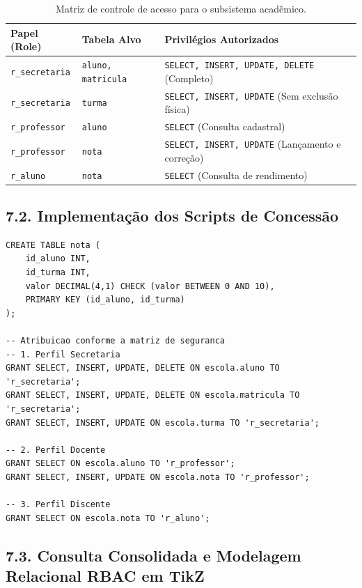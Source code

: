 \begin{table}[h!]
\centering
\small
\begin{tabular}{|l|l|l|}
\hline
\textbf{Papel (Role)} & \textbf{Tabela Alvo} & \textbf{Privilégios Autorizados} \\ \hline
\texttt{r\_secretaria} & \texttt{aluno, matricula} & \texttt{SELECT, INSERT, UPDATE, DELETE} (Completo) \\ \hline
\texttt{r\_secretaria} & \texttt{turma} & \texttt{SELECT, INSERT, UPDATE} (Sem exclusão física) \\ \hline
\texttt{r\_professor} & \texttt{aluno} & \texttt{SELECT} (Consulta cadastral) \\ \hline
\texttt{r\_professor} & \texttt{nota} & \texttt{SELECT, INSERT, UPDATE} (Lançamento e correção) \\ \hline
\texttt{r\_aluno} & \texttt{nota} & \texttt{SELECT} (Consulta de rendimento) \\ \hline
\end{tabular}
\caption{Matriz de controle de acesso para o subsistema acadêmico.}
\end{table}

\subsection*{7.2. Implementação dos Scripts de Concessão}

\begin{lstlisting}
CREATE TABLE nota (
    id_aluno INT,
    id_turma INT,
    valor DECIMAL(4,1) CHECK (valor BETWEEN 0 AND 10),
    PRIMARY KEY (id_aluno, id_turma)
);

-- Atribuicao conforme a matriz de seguranca
-- 1. Perfil Secretaria
GRANT SELECT, INSERT, UPDATE, DELETE ON escola.aluno TO 'r_secretaria';
GRANT SELECT, INSERT, UPDATE, DELETE ON escola.matricula TO 'r_secretaria';
GRANT SELECT, INSERT, UPDATE ON escola.turma TO 'r_secretaria';

-- 2. Perfil Docente
GRANT SELECT ON escola.aluno TO 'r_professor';
GRANT SELECT, INSERT, UPDATE ON escola.nota TO 'r_professor';

-- 3. Perfil Discente
GRANT SELECT ON escola.nota TO 'r_aluno';
\end{lstlisting}

\subsection*{7.3. Consulta Consolidada e Modelagem Relacional RBAC em TikZ}

